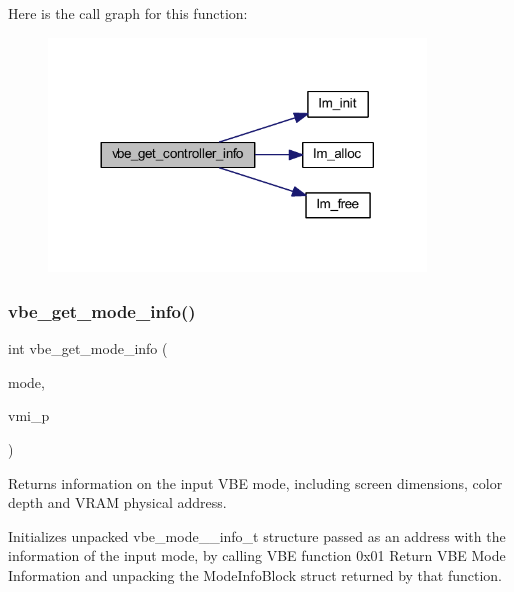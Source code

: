 Here is the call graph for this function\+:
\nopagebreak
\begin{figure}[H]
\begin{center}
\leavevmode
\includegraphics[width=284pt]{group__vbe_ga04ba27e16f8dc8fb472f6f57cf66538a_cgraph}
\end{center}
\end{figure}
\hypertarget{group__vbe_ga4ef3234e41f2050bc094a22049b69e45}{}\label{group__vbe_ga4ef3234e41f2050bc094a22049b69e45} 
\subsubsection{\texorpdfstring{vbe\+\_\+get\+\_\+mode\+\_\+info()}{vbe\_get\_mode\_info()}}
{\footnotesize\ttfamily int vbe\+\_\+get\+\_\+mode\+\_\+info (\begin{DoxyParamCaption}\item[{unsigned short}]{mode,  }\item[{vbe\+\_\+mode\+\_\+info\+\_\+t $\ast$}]{vmi\+\_\+p }\end{DoxyParamCaption})}



Returns information on the input V\+BE mode, including screen dimensions, color depth and V\+R\+AM physical address. 

Initializes unpacked vbe\+\_\+mode\+\_\+\+\_\+info\+\_\+t structure passed as an address with the information of the input mode, by calling V\+BE function 0x01 Return V\+BE Mode Information and unpacking the Mode\+Info\+Block struct returned by that function.


